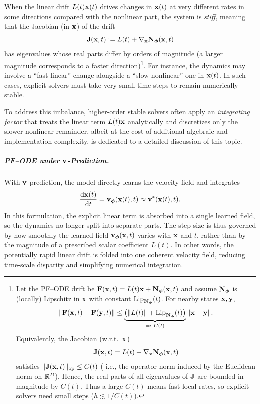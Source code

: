 When the linear drift $L(t) {\mathbf{x}}(t)$ drives changes in ${\mathbf{x}}(t)$ at very different rates in some directions compared with the nonlinear part, the system is \emph{stiff}, meaning that the Jacobian (in ${\mathbf{x}}$) of the drift
\[
{\mathbf{J}}({\mathbf{x}},t):=L(t)+\nabla_{{\mathbf{x}}}{\mathbf{N}}_{\bm{\phi}}({\mathbf{x}},t)
\]
has eigenvalues whose real parts differ by orders of magnitude (a larger magnitude corresponds to a faster direction)\footnote{%
Let the PF–ODE drift be ${\mathbf{F}}({\mathbf{x}},t)=L(t) {\mathbf{x}}+{\mathbf{N}}_{{\bm{\phi}}}({\mathbf{x}},t)$ and assume
${\mathbf{N}}_{{\bm{\phi}}}$ is (locally) Lipschitz in ${\mathbf{x}}$ with constant $\mathrm{Lip}_{{\mathbf{N}}_{{\bm{\phi}}}}(t)$.
For nearby states ${\mathbf{x}},{\mathbf{y}}$,
\[
\|{\mathbf{F}}({\mathbf{x}},t)-{\mathbf{F}}({\mathbf{y}},t)\|
\le \underbrace{\big(\|L(t)\|+\mathrm{Lip}_{{\mathbf{N}}_{{\bm{\phi}}}}(t)\big)}_{=:~C(t)} \|{\mathbf{x}}-{\mathbf{y}}\|.
\]
Equivalently, the Jacobian (w.r.t.\ ${\mathbf{x}}$)
\[
{\mathbf{J}}({\mathbf{x}},t)=L(t)+\nabla_{{\mathbf{x}}}{\mathbf{N}}_{\bm{\phi}}({\mathbf{x}},t)
\]
satisfies $\|{\mathbf{J}}({\mathbf{x}},t)\|_{\mathrm{op}} \le C(t)$ ( i.e., the operator norm induced by the Euclidean norm on $\mathbb{R}^D$). Hence, the real parts of all eigenvalues of ${\mathbf{J}}$ are bounded in magnitude by $C(t)$.
Thus a large $C(t)$ means fast local rates, so explicit solvers need small steps ($h\lesssim 1/C(t)$).}. For instance, the dynamics may involve a ``fast linear'' change alongside a ``slow nonlinear'' one in ${\mathbf{x}}(t)$. In such cases, explicit solvers must take very small time steps to remain numerically stable.




To address this imbalance, higher-order stable solvers often apply an \emph{integrating factor} 
that treats the linear term $L(t) {\mathbf{x}}$ analytically and discretizes only the slower nonlinear remainder, albeit at the cost of additional algebraic and implementation complexity.  is dedicated to a detailed discussion of this topic.


\subparagraph{PF--ODE under ${\mathbf{v}}$-Prediction.} With ${\mathbf{v}}$-prediction, the model directly learns the velocity field and integrates
\[
\frac{\mathop{}\!\mathrm{d} {\mathbf{x}}(t)}{\mathop{}\!\mathrm{d} t}
={\mathbf{v}}_{{\bm{\phi}}}({\mathbf{x}}(t),t)
\approx {\mathbf{v}}^*({\mathbf{x}}(t),t).
\]
In this formulation, the explicit linear term is absorbed into a single learned field, 
so the dynamics no longer split into separate parts. The step size is thus governed by how smoothly 
the learned field ${\mathbf{v}}_{{\bm{\phi}}}({\mathbf{x}},t)$ varies with ${\mathbf{x}}$ and $t$, rather than by the 
magnitude of a prescribed scalar coefficient $L(t)$. In other words, the potentially 
rapid linear drift is folded into one coherent velocity field, reducing time-scale 
disparity and simplifying numerical integration. 
 

